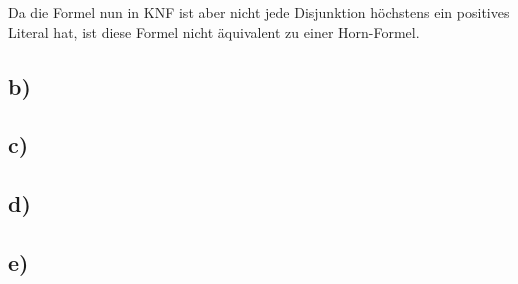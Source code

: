\documentclass[11pt, a4paper]{article}
\begin{document}
Da die Formel nun in KNF ist aber nicht jede Disjunktion höchstens ein positives Literal hat, ist diese Formel nicht äquivalent zu einer Horn-Formel.



\subsection*{b)}

\subsection*{c)}

\subsection*{d)}

\subsection*{e)}
\end{document}
